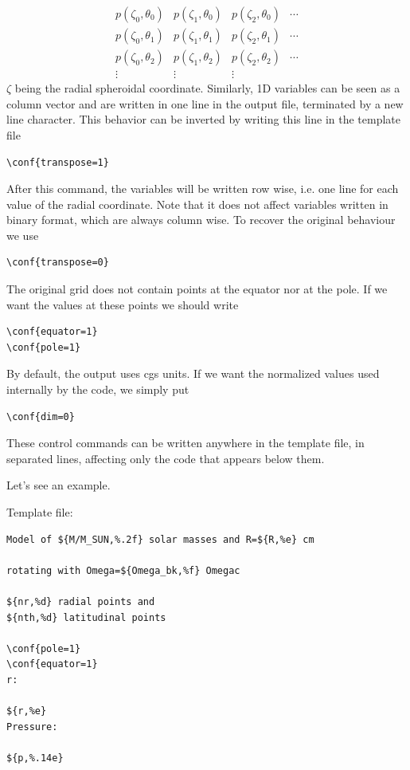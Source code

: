 $$\begin{array}{cccc}
p(\zeta_0,\theta_0)&p(\zeta_1,\theta_0)&p(\zeta_2,\theta_0)&\cdots\\
p(\zeta_0,\theta_1)&p(\zeta_1,\theta_1)&p(\zeta_2,\theta_1)&\cdots\\
p(\zeta_0,\theta_2)&p(\zeta_1,\theta_2)&p(\zeta_2,\theta_2)&\cdots\\
\vdots&\vdots&\vdots&
\end{array}$$
$\zeta$ being the radial spheroidal coordinate.  Similarly, 1D variables
can be seen as a column vector and are written in one line in the output
file, terminated by a new line character.  This behavior can be inverted
by writing this line in the template file

\begin{verbatim}
\conf{transpose=1}
\end{verbatim}
After this command, the variables will be written row wise, i.e. one line
for each value of the radial coordinate. Note that it does not affect
variables written in binary format, which are always column wise. To
recover the original behaviour we use

\begin{verbatim}
\conf{transpose=0}
\end{verbatim}
The original grid  does not contain points at the equator nor at the pole. If
we want the values at these points we should write

\begin{verbatim}
\conf{equator=1}
\conf{pole=1}
\end{verbatim}
By default, the output uses cgs units. If we want the normalized values
used internally by the code, we simply put

\begin{verbatim}
\conf{dim=0}
\end{verbatim}
These control commands can be written anywhere in the template file,
in separated lines, affecting only the code that appears below them.

Let's see an example.

Template file:
\begin{verbatim}
Model of ${M/M_SUN,%.2f} solar masses and R=${R,%e} cm

rotating with Omega=${Omega_bk,%f} Omegac

${nr,%d} radial points and 
${nth,%d} latitudinal points

\conf{pole=1}
\conf{equator=1}
r:

${r,%e}
Pressure:

${p,%.14e}

\end{verbatim} 

